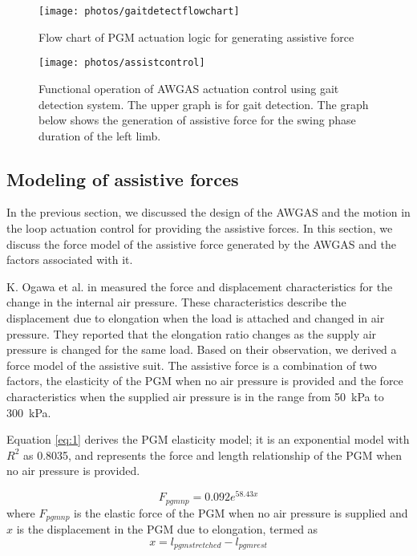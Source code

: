 \documentclass[paper,JRM,paper]{jaciiiarticle}
\begin{document}
\begin{figure}[h]
	\centering
	\texttt{[image: photos/gaitdetectflowchart]}
	\caption{Flow chart of PGM actuation logic for generating assistive force}
	\label{fig:gaitdetectflowchart}
\end{figure}

\begin{figure}
	\centering
	\texttt{[image: photos/assistcontrol]}
	\caption{Functional operation of AWGAS actuation control using gait detection system. The upper graph is for gait detection. The graph below shows the generation of assistive force for the swing phase duration of the left limb.}
	\label{fig:assistcontrol}
\end{figure}


\subsection{Modeling of assistive forces}
In the previous section, we discussed the design of the AWGAS and the motion in the loop actuation control for providing the assistive forces. In this section, we discuss the force model of the assistive force generated by the AWGAS and the factors associated with it. 

K. Ogawa et al. in \cite{11} measured the force and displacement characteristics for the change in the internal air pressure. These characteristics describe the displacement due to elongation when the load is attached and changed in air pressure. They reported that the elongation ratio changes as the supply air pressure is changed for the same load. Based on their observation, we derived a force model of the assistive suit. The assistive force is a combination of two factors, the elasticity of the PGM when no air pressure is provided and the force characteristics when the supplied air pressure is in the range from \SI{50}{\kilo\pascal} to \SI{300}{\kilo\pascal}. 

Equation \ref{eq:1} derives the PGM elasticity model; it is an exponential model with $R^{2}$ as 0.8035, and represents the force and length relationship of the PGM when no air pressure is provided. 

\begin{equation}\label{eq:1}
F_{pgmnp} = 0.092e^{58.43x}
\end{equation}
where
$F_{pgmnp}$ is the elastic force of the PGM when no air pressure is supplied and $x$ is the displacement in the PGM due to elongation, termed as
\[x = l_{pgmstretched} - l_{pgmrest} \] 
\end{document}
